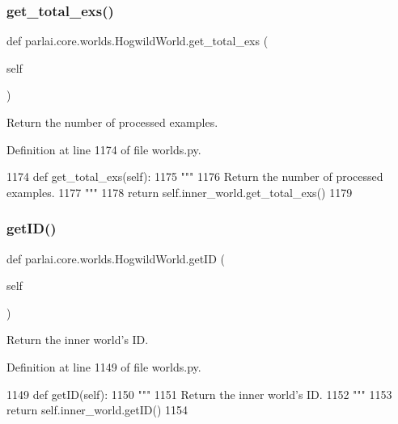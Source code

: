 \subsubsection{\texorpdfstring{get\+\_\+total\+\_\+exs()}{get\_total\_exs()}}
{\footnotesize\ttfamily def parlai.\+core.\+worlds.\+Hogwild\+World.\+get\+\_\+total\+\_\+exs (\begin{DoxyParamCaption}\item[{}]{self }\end{DoxyParamCaption})}

\begin{DoxyVerb}Return the number of processed examples.
\end{DoxyVerb}
 

Definition at line 1174 of file worlds.\+py.


\begin{DoxyCode}
1174     \textcolor{keyword}{def }get\_total\_exs(self):
1175         \textcolor{stringliteral}{"""}
1176 \textcolor{stringliteral}{        Return the number of processed examples.}
1177 \textcolor{stringliteral}{        """}
1178         \textcolor{keywordflow}{return} self.inner\_world.get\_total\_exs()
1179 
\end{DoxyCode}
\mbox{\label{classparlai_1_1core_1_1worlds_1_1HogwildWorld_a67379773119cebd6ac70fce2abcb19a9}} 
\subsubsection{\texorpdfstring{get\+I\+D()}{getID()}}
{\footnotesize\ttfamily def parlai.\+core.\+worlds.\+Hogwild\+World.\+get\+ID (\begin{DoxyParamCaption}\item[{}]{self }\end{DoxyParamCaption})}

\begin{DoxyVerb}Return the inner world's ID.
\end{DoxyVerb}
 

Definition at line 1149 of file worlds.\+py.


\begin{DoxyCode}
1149     \textcolor{keyword}{def }getID(self):
1150         \textcolor{stringliteral}{"""}
1151 \textcolor{stringliteral}{        Return the inner world's ID.}
1152 \textcolor{stringliteral}{        """}
1153         \textcolor{keywordflow}{return} self.inner\_world.getID()
1154 
\end{DoxyCode}
\mbox{\label{classparlai_1_1core_1_1worlds_1_1HogwildWorld_ae0b4dc3d2bb4d1dbda7970da03da1a6e}} 
